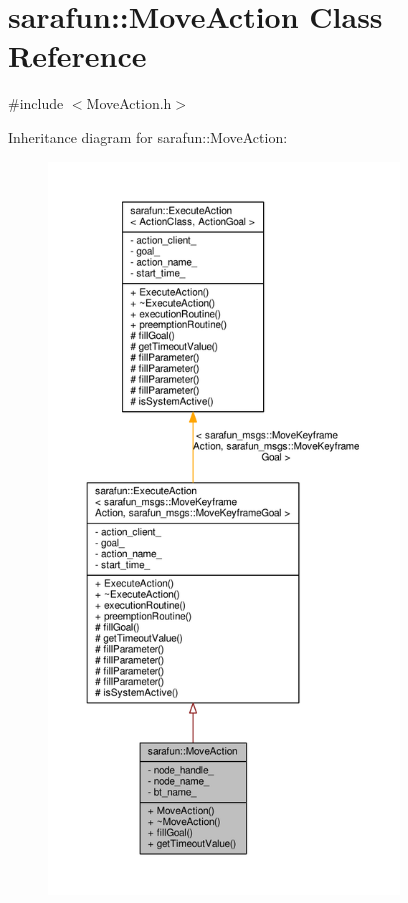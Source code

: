 \hypertarget{classsarafun_1_1MoveAction}{\section{sarafun\-:\-:Move\-Action Class Reference}
\label{classsarafun_1_1MoveAction}
}


{\ttfamily \#include $<$Move\-Action.\-h$>$}



Inheritance diagram for sarafun\-:\-:Move\-Action\-:
\nopagebreak
\begin{figure}[H]
\begin{center}
\leavevmode
\includegraphics[height=550pt]{d1/d63/classsarafun_1_1MoveAction__inherit__graph}
\end{center}
\end{figure}


